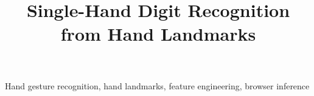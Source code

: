 \documentclass{article}
\title{Single-Hand Digit Recognition from Hand Landmarks}
\begin{document}
\maketitle

\begin{abstract}

\end{abstract}

\begin{keywords}
Hand gesture recognition, hand landmarks, feature engineering, browser inference
\end{keywords}








\end{document}
